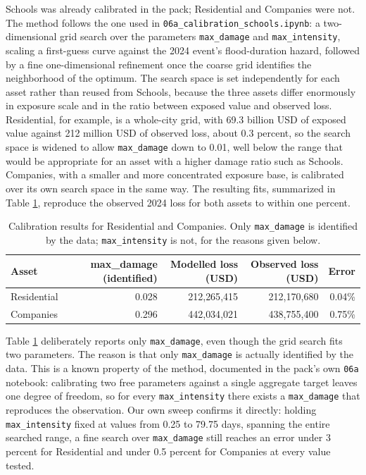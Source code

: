 \documentclass[11pt]{article}
\begin{document}
Schools was already calibrated in the pack; Residential and Companies were not. The method
follows the one used in \texttt{06a\_calibration\_schools.ipynb}: a two-dimensional grid
search over the parameters \texttt{max\_damage} and \texttt{max\_intensity}, scaling a
first-guess curve against the 2024 event's flood-duration hazard, followed by a fine
one-dimensional refinement once the coarse grid identifies the neighborhood of the optimum.
The search space is set independently for each asset rather than reused from Schools,
because the three assets differ enormously in exposure scale and in the ratio between
exposed value and observed loss. Residential, for example, is a whole-city grid, with 69.3
billion USD of exposed value against 212 million USD of observed loss, about 0.3 percent,
so the search space is widened to allow \texttt{max\_damage} down to 0.01, well below the
range that would be appropriate for an asset with a higher damage ratio such as Schools.
Companies, with a smaller and more concentrated exposure base, is calibrated over its own
search space in the same way. The resulting fits, summarized in Table \ref{tab:calibration},
reproduce the observed 2024 loss for both assets to within one percent.

\begin{table}[H]
\centering
\caption{Calibration results for Residential and Companies. Only \texttt{max\_damage} is
identified by the data; \texttt{max\_intensity} is not, for the reasons given below.}
\label{tab:calibration}
\small
\begin{tabular}{lrrrr}
\toprule
Asset & max\_damage (identified) & Modelled loss (USD) & Observed loss (USD) & Error \\
\midrule
Residential & 0.028 & 212{,}265{,}415 & 212{,}170{,}680 & 0.04\% \\
Companies & 0.296 & 442{,}034{,}021 & 438{,}755{,}400 & 0.75\% \\
\bottomrule
\end{tabular}
\end{table}

Table \ref{tab:calibration} deliberately reports only \texttt{max\_damage}, even though the
grid search fits two parameters. The reason is that only \texttt{max\_damage} is actually
identified by the data. This is a known property of the method, documented in the pack's
own \texttt{06a} notebook: calibrating two free parameters against a single aggregate
target leaves one degree of freedom, so for every \texttt{max\_intensity} there exists a
\texttt{max\_damage} that reproduces the observation. Our own sweep confirms it directly:
holding \texttt{max\_intensity} fixed at values from 0.25 to 79.75 days, spanning the
entire searched range, a fine search over \texttt{max\_damage} still reaches an error under
3 percent for Residential and under 0.5 percent for Companies at every value tested.
\end{document}
